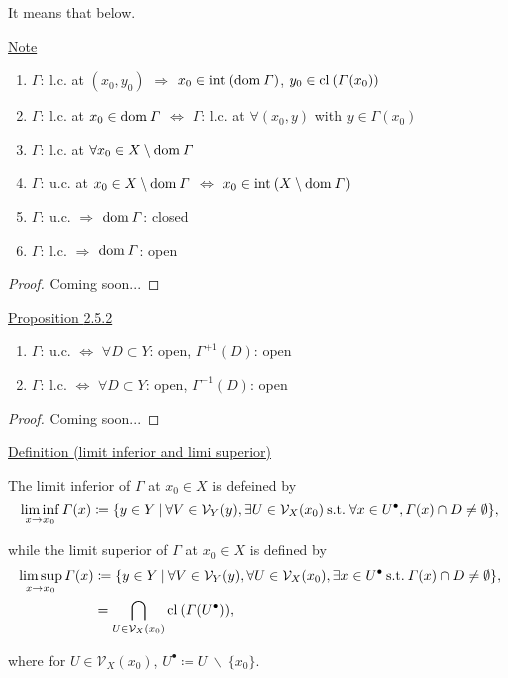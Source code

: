 \documentclass[a4paper,11pt]{jsarticle}
\newcommand{\DEFINITION}[2]{\begin{itembox}[l]{\underline{Definition {#1} }}{#2}\end{itembox}} %
\newcommand{\PROPOSITION}[2]{\begin{itembox}[l]{\underline{Proposition {#1} }}{#2}\end{itembox}} %
\newcommand{\NOTE}[1]{\begin{itembox}[l]{\underline{Note}}{#1}\end{itembox}} %
\newcommand{\SuchThat}{\:\text{s.t.}\:}
\newcommand{\Backslash}{\:\backslash\:}
\newcommand{\Int}[1]{\text{int\:${#1}$}} %
\newcommand{\Cl}[1]{\text{cl\:${#1}$}} %
\newcommand{\Dom}[1]{\text{dom\:${#1}$}} %
\newcommand{\SetForm}[2]{
  \{{#1}\:|\:{#2}\}
}
\newcommand{\NonCenterNeighborhood}[1]{
  {#1}^{\bullet}
}
\newcommand{\FammilyOfNeighborhood}[2]{
  \mathcal{V}_{{#1}}({#2})
}
\newcommand{\ImageSet}[2]{
  {#1}({#2})
}
\newcommand{\InverseSet}[3][-]{
  {#2}^{{#1}1}({#3})
}
\begin{document}
It means that below.

\NOTE{
  \begin{enumerate}[label=\roman*,align=CenterWithParen]
    \item $\varGamma$: l.c. at $(x_0, y_0)$ $\Rightarrow$ $x_0 \in \Int{(\Dom{\varGamma})}$, $y_0 \in \Cl{(\varGamma (x_0))}$
    \item $\varGamma$: l.c. at $x_0 \in \Dom{\varGamma}$ $\Leftrightarrow$ $\varGamma$: l.c. at $\forall (x_0, y)$ with $y \in \varGamma (x_0)$
    \item $\varGamma$: l.c. at $\forall x_0 \in X \Backslash \Dom{\varGamma}$
    \item $\varGamma$: u.c. at $x_0 \in X \Backslash \Dom{\varGamma}$ $\Leftrightarrow$ $x_0 \in \Int{(X \Backslash \Dom{\varGamma})}$
    \item $\varGamma$: u.c. $\Rightarrow$ $\Dom{\varGamma}$: closed
    \item $\varGamma$: l.c. $\Rightarrow$ $\Dom{\varGamma}$: open
  \end{enumerate}
}

\begin{proof}
  Coming soon...
\end{proof}

\PROPOSITION{2.5.2}{
  \begin{enumerate}[label=\roman*,align=CenterWithParen]
    \item $\varGamma$: u.c. $\Leftrightarrow$ $\forall D \subset Y$: open, $\InverseSet[+]{\varGamma}{D}$: open
    \item $\varGamma$: l.c. $\Leftrightarrow$ $\forall D \subset Y$: open, $\InverseSet{\varGamma}{D}$: open
  \end{enumerate}
}

\begin{proof}
  Coming soon...
\end{proof}
\DEFINITION{(limit inferior and limi superior)}{
  The limit inferior of $\varGamma$ at $x_0 \in X$ is defeined by
  \begin{equation}
    \liminf_{x \to x_0} \varGamma (x) \coloneqq \SetForm{y \in Y}{\forall V \in \FammilyOfNeighborhood{Y}{y}, \exists U \in \FammilyOfNeighborhood{X}{x_0} \SuchThat \forall x \in \NonCenterNeighborhood{U}, \varGamma (x) \cap D \ne \emptyset}, \notag
  \end{equation}

  while the limit superior of $\varGamma$ at $x_0 \in X$ is defined by
  \begin{equation}
    \begin{split}
      \limsup_{x \to x_0} \varGamma (x) &\coloneqq \SetForm{y \in Y}{\forall V \in \FammilyOfNeighborhood{Y}{y}, \forall U \in \FammilyOfNeighborhood{X}{x_0}, \exists x \in \NonCenterNeighborhood{U} \SuchThat \varGamma (x) \cap D \ne \emptyset}, \\
      &= \bigcap_{U \in \FammilyOfNeighborhood{X}{x_0}} \Cl{(\ImageSet{\varGamma}{\NonCenterNeighborhood{U}})}, \notag
    \end{split}
  \end{equation}

  where for $U \in \FammilyOfNeighborhood{X}{x_0}$, $\NonCenterNeighborhood{U} \coloneqq U \Backslash \{x_0\}$.
}
\end{document}
